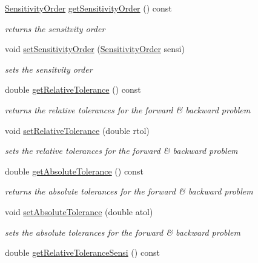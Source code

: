 \begin{DoxyCompactItemize}
\mbox{\hyperlink{namespaceamici_aaa03ec2f8c4d5323b98d71134a462fda}{Sensitivity\+Order}} \mbox{\hyperlink{classamici_1_1_solver_affde3089fec2a1cca40d6cc0c4c2cf1d}{get\+Sensitivity\+Order}} () const
\begin{DoxyCompactList}\small\item\em returns the sensitvity order \end{DoxyCompactList}\item 
void \mbox{\hyperlink{classamici_1_1_solver_a26129f061fdf7869be2d3e4aa22532b6}{set\+Sensitivity\+Order}} (\mbox{\hyperlink{namespaceamici_aaa03ec2f8c4d5323b98d71134a462fda}{Sensitivity\+Order}} sensi)
\begin{DoxyCompactList}\small\item\em sets the sensitvity order \end{DoxyCompactList}\item 
double \mbox{\hyperlink{classamici_1_1_solver_a54fe1b062315ed19b2dbf88206415e06}{get\+Relative\+Tolerance}} () const
\begin{DoxyCompactList}\small\item\em returns the relative tolerances for the forward \& backward problem \end{DoxyCompactList}\item 
void \mbox{\hyperlink{classamici_1_1_solver_afb5f0c48f24e4bc3efad8ef599adde56}{set\+Relative\+Tolerance}} (double rtol)
\begin{DoxyCompactList}\small\item\em sets the relative tolerances for the forward \& backward problem \end{DoxyCompactList}\item 
double \mbox{\hyperlink{classamici_1_1_solver_a676df944b6737474dd4ef74fe9212f3e}{get\+Absolute\+Tolerance}} () const
\begin{DoxyCompactList}\small\item\em returns the absolute tolerances for the forward \& backward problem \end{DoxyCompactList}\item 
void \mbox{\hyperlink{classamici_1_1_solver_afe0fd2fad6ce110ad8421f5979945f90}{set\+Absolute\+Tolerance}} (double atol)
\begin{DoxyCompactList}\small\item\em sets the absolute tolerances for the forward \& backward problem \end{DoxyCompactList}\item 
double \mbox{\hyperlink{classamici_1_1_solver_a399bb102a2481c2c4c421d700dd2f0a2}{get\+Relative\+Tolerance\+Sensi}} () const

\end{DoxyCompactItemize}
